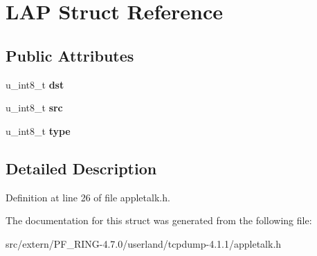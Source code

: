 \hypertarget{struct_l_a_p}{
\section{LAP Struct Reference}
\label{struct_l_a_p}
}
\subsection*{Public Attributes}
\begin{DoxyCompactItemize}
\item 
\hypertarget{struct_l_a_p_a4586703e1447495890ce61e6432b0cb0}{
u\_\-int8\_\-t {\bfseries dst}}
\label{struct_l_a_p_a4586703e1447495890ce61e6432b0cb0}

\item 
\hypertarget{struct_l_a_p_ad8b7798fe7df60d0167e63dafd2764ee}{
u\_\-int8\_\-t {\bfseries src}}
\label{struct_l_a_p_ad8b7798fe7df60d0167e63dafd2764ee}

\item 
\hypertarget{struct_l_a_p_a9d0618b3da604d55e9bfa514d69baade}{
u\_\-int8\_\-t {\bfseries type}}
\label{struct_l_a_p_a9d0618b3da604d55e9bfa514d69baade}

\end{DoxyCompactItemize}


\subsection{Detailed Description}


Definition at line 26 of file appletalk.h.



The documentation for this struct was generated from the following file:\begin{DoxyCompactItemize}
\item 
src/extern/PF\_\-RING-\/4.7.0/userland/tcpdump-\/4.1.1/appletalk.h\end{DoxyCompactItemize}
